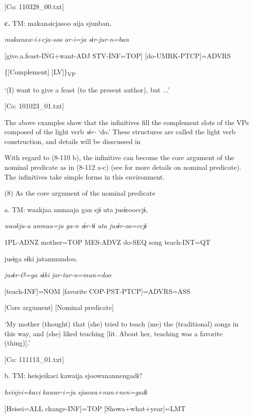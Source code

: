       [Co: 110328\_00.txt]

  \textbf{c.}  TM:  makanəicjasoo  aija  sjunban,

      \textit{makanaw-i+cja-soo}  \textit{ar-i=ja}  \textit{sɨr{}-jur-n=ban}

      [give.a.feast-ING+want-ADJ  STV-INF=TOP]  [do-UMRK-PTCP]=ADVRS

      \{[Complement]    [LV]\}\textsubscript{VP}

      ‘(I) want to give a feast (to the present author), but ...’

      [Co: 101023\_01.txt]

The above examples show that the infinitives fill the complement slots of the VPs composed of the light verb \textit{sɨr-} ‘do.’ These structures are called the light verb construction, and details will be disscussed in 

  With regard to (8-110 b), the infinitive can become the core argument of the nominal predicate as in (8-112 a-c) (see  for more details on nominal predicate). The infinitives take simple forms in this environment.

(8)  As the core argument of the nominal predicate

  a.  TM:  waakjaa  anmaaja  gan  sjɨ  uta  jusɨrooccjɨ,

      \textit{waakja-a}  \textit{anmaa=ja}  \textit{ga-n}  \textit{sɨr-tɨ}  \textit{uta}  \textit{jusɨr-oo=ccjɨ}

      1PL-ADNZ  mother=TOP  MES-ADVZ  do-SEQ  song  teach-INT=QT

      jusɨga  sɨki  jatanmundoo.

      \textit{jusɨr-Ø=ga}  \textit{sɨki}  \textit{jar-tar-n=mun=doo}

      [teach-INF]=NOM  [favorite  COP-PST-PTCP]=ADVRS=ASS

      [Core argument]  [Nominal predicate]

      ‘My mother (thought) that (she) tried to teach (me) the (traditional) songs in this way, and (she) liked teaching [lit. About her, teaching was a favorite (thing)].’

      [Co: 111113\_01.txt]

  b.  TM:  heisjeikaci  kawaija  {\textbar}sjoowanannen{\textbar}gadɨ?

      \textit{heisjei=kaci}  \textit{kawar-i=ja}  \textit{sjoowa+nan+nen=gadɨ}

      [Heisei=ALL  change-INF]=TOP  [Showa+what+year]=LMT

